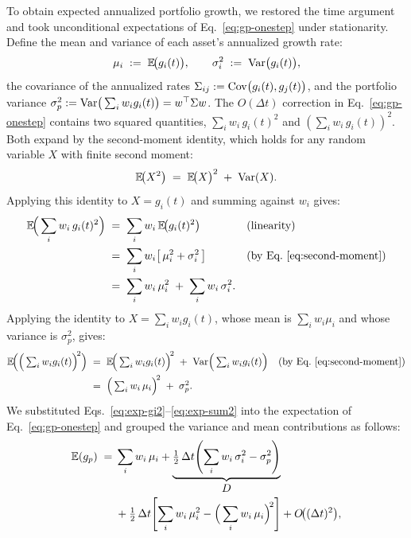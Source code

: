 To obtain expected annualized portfolio growth, we restored the time
argument and took unconditional expectations of
Eq.~\eqref{eq:gp-onestep} under stationarity. Define the mean and
variance of each asset's annualized growth rate:
\begin{equation}
  \mu_i \;:=\; \mathbb{E}\!\big(g_i(t)\big), \qquad
  \sigma_i^2 \;:=\; \operatorname{Var}\!\big(g_i(t)\big),
\end{equation}
the covariance of the annualized rates
$\Sigma_{ij} := \operatorname{Cov}\!\big(g_i(t), g_j(t)\big)$, and the portfolio
variance
$\sigma_p^2 := \operatorname{Var}\!\big(\textstyle\sum_i w_i g_i(t)\big) =
w^\top \Sigma w$. The $O(\Delta t)$ correction in
Eq.~\eqref{eq:gp-onestep} contains two squared quantities,
$\sum_i w_i\, g_i(t)^2$ and $(\sum_i w_i\, g_i(t))^2$. Both expand
by the second-moment identity, which holds for any random variable
$X$ with finite second moment:
\begin{equation}
  \mathbb{E}\!\big(X^2\big) \;=\; \mathbb{E}\!\big(X\big)^2 \;+\; \operatorname{Var}(X).
  \label{eq:second-moment}
\end{equation}
Applying this identity to $X = g_i(t)$ and summing against $w_i$ gives:
\begin{align}
  \mathbb{E}\!\Big(\sum_{i} w_i\, g_i(t)^2\Big)
   &\;=\; \sum_{i} w_i\, \mathbb{E}\!\big(g_i(t)^2\big)
       && \text{(linearity)} \notag \\
   &\;=\; \sum_{i} w_i\!\left[\,\mu_i^2 + \sigma_i^2\,\right]
       && \text{(by Eq.~\eqref{eq:second-moment})} \notag \\
   &\;=\; \sum_{i} w_i\, \mu_i^2 \;+\; \sum_{i} w_i\, \sigma_i^2.
   \label{eq:exp-gi2}
\end{align}
Applying the identity to $X = \sum_i w_i g_i(t)$, whose mean is
$\sum_i w_i\mu_i$ and whose variance is $\sigma_p^2$, gives:
\begin{align}
  \mathbb{E}\!\Big(\Big(\textstyle\sum_{i} w_i g_i(t)\Big)^{\!2}\Big)
   &\;=\; \mathbb{E}\!\Big(\textstyle\sum_{i} w_i g_i(t)\Big)^{\!2}
       \;+\; \operatorname{Var}\!\Big(\textstyle\sum_{i} w_i g_i(t)\Big)
       && \text{(by Eq.~\eqref{eq:second-moment})} \notag \\
   &\;=\; \Big(\textstyle\sum_{i} w_i\, \mu_i\Big)^{\!2}
       \;+\; \sigma_p^2.
   \label{eq:exp-sum2}
\end{align}
We substituted Eqs.~\eqref{eq:exp-gi2}--\eqref{eq:exp-sum2} into the
expectation of Eq.~\eqref{eq:gp-onestep} and grouped the variance and
mean contributions as follows:
\begin{equation}
\begin{aligned}
  \mathbb{E}(g_p) \;={}& \sum_{i} w_i\, \mu_i
  + \underbrace{\tfrac{1}{2}\,\Delta t\!\left(\sum_{i} w_i\, \sigma_i^2
       - \sigma_p^2\right)}_{\displaystyle D} \\
  &+ \tfrac{1}{2}\,\Delta t\!\left[\sum_{i} w_i\, \mu_i^2
       - \Big(\sum_{i} w_i\, \mu_i\Big)^{\!2}\right]
  + O\!\big((\Delta t)^2\big),
\end{aligned}
  \label{eq:booth-fama}
\end{equation}
